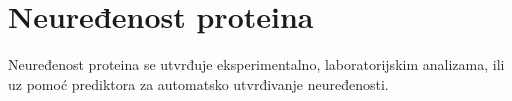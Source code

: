 \section{Neuređenost proteina}

Neuređenost proteina se utvrđuje eksperimentalno, laboratorijskim analizama, ili uz pomoć prediktora za automatsko utvrđivanje neuređenosti.